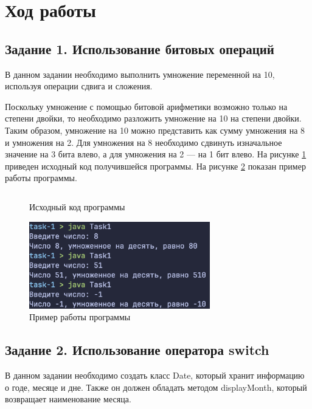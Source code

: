 \documentclass[a4paper, 14pt]{extarticle}
\begin{document}
\section*{Ход работы}

\subsection*{Задание 1. Использование битовых операций}

В данном задании необходимо выполнить умножение переменной на 10, используя
операции сдвига и сложения.

Поскольку умножение с помощью битовой арифметики возможно только на степени
двойки, то необходимо разложить умножение на 10 на степени двойки. Таким
образом, умножение на 10 можно представить как сумму умножения на 8 и умножения
на 2. Для умножения на 8 необходимо сдвинуть изначальное значение на 3 бита
влево, а для умножения на 2 --- на 1 бит влево. На рисунке \ref{fig:task-1-1}
приведен исходный код получившейся программы. На рисунке \ref{fig:task-1-2}
показан пример работы программы.

\begin{figure}[H]
  \centering
  \inputminted{java}{../code/task-1/Task1.java}
  \caption{Исходный код программы}
  \label{fig:task-1-1}
\end{figure}

\begin{figure}[H]
  \centering
  \includegraphics[width=0.7\textwidth]{images/task-1.png}
  \caption{Пример работы программы}
  \label{fig:task-1-2}
\end{figure}

\subsection*{Задание 2. Использование оператора switch}

В данном задании необходимо создать класс Date, который хранит информацию о
годе, месяце и дне. Также он должен обладать методом
\foreignlanguage{english}{displayMonth}, который возвращает наименование месяца.
\end{document}
